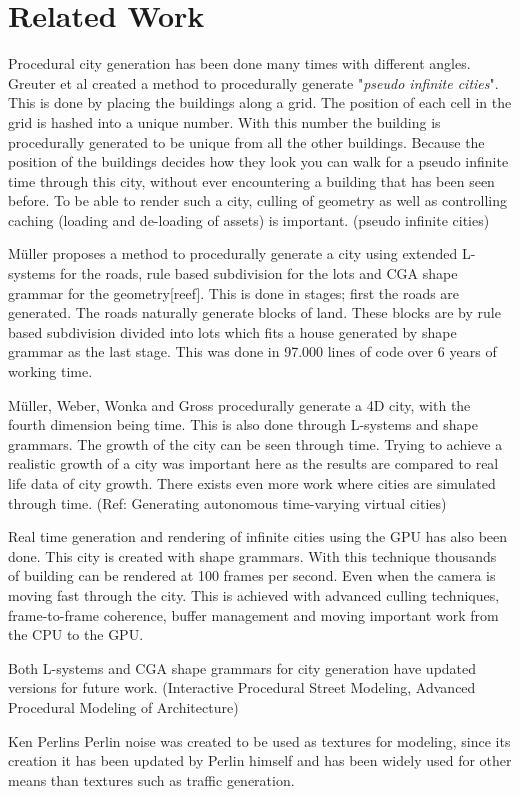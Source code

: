 \section{Related Work}
Procedural city generation has been done many times with different angles. Greuter et al\cite{PseudoInfiniteCities} created a method to procedurally generate "\textit{pseudo infinite cities}". This is done by placing the buildings along a grid. The position of each cell in the grid is hashed into a unique number. With this number the building is procedurally generated to be unique from all the other buildings. Because the position of the buildings decides how they look you can walk for a pseudo infinite time through this city, without ever encountering a building that has been seen before. To be able to render such a city, culling of geometry as well as controlling caching (loading and de-loading of assets) is important. (pseudo infinite cities)

\par 
Müller proposes a method to procedurally generate a city using extended L-systems for the roads, rule based subdivision for the lots and CGA shape grammar for the geometry[reef]. This is done in stages; first the roads are generated. The roads naturally generate blocks of land. These blocks are by rule based subdivision divided into lots which fits a house generated by shape grammar as the last stage. This was done in 97.000 lines of code over 6 years of working time. \cite{ProceduralModeling}\cite{ProceduralModeling6}

\par
Müller, Weber, Wonka and Gross procedurally generate a 4D city, with the fourth dimension being time. This is also done through L-systems and shape grammars. The growth of the city can be seen through time. Trying to achieve a realistic growth of a city was important here as the results are compared to real life data of city growth. \cite{4DCities} There exists even more work where cities are simulated through time. (Ref: Generating autonomous time-varying virtual cities)

\par
Real time generation and rendering of infinite cities using the GPU has also been done. This city is created with shape grammars. With this technique thousands of building can be rendered at 100 frames per second. Even when the camera is moving fast through the city. This is achieved with advanced culling techniques, frame-to-frame coherence, buffer management and moving important work from the CPU to the GPU.

\par
Both L-systems and CGA shape grammars for city generation have updated versions for future work. (Interactive Procedural Street Modeling, Advanced Procedural Modeling of Architecture)

\par
Ken Perlins Perlin noise was created to be used as textures for modeling, since its creation it has been updated by Perlin himself and has been widely used for other means than textures such as traffic generation. \cite{PerlinNoise}\cite{TrafficGenerator}